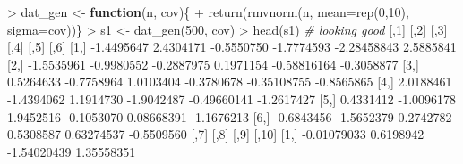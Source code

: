\documentclass[
]{article}
\newenvironment{Shaded}{\begin{snugshade}}{\end{snugshade}}
\newcommand{\AttributeTok}[1]{\textcolor[rgb]{0.77,0.63,0.00}{#1}}
\newcommand{\CommentTok}[1]{\textcolor[rgb]{0.56,0.35,0.01}{\textit{#1}}}
\newcommand{\ControlFlowTok}[1]{\textcolor[rgb]{0.13,0.29,0.53}{\textbf{#1}}}
\newcommand{\DecValTok}[1]{\textcolor[rgb]{0.00,0.00,0.81}{#1}}
\newcommand{\FloatTok}[1]{\textcolor[rgb]{0.00,0.00,0.81}{#1}}
\newcommand{\FunctionTok}[1]{\textcolor[rgb]{0.00,0.00,0.00}{#1}}
\newcommand{\NormalTok}[1]{#1}
\newcommand{\OtherTok}[1]{\textcolor[rgb]{0.56,0.35,0.01}{#1}}
\newcommand{\SpecialCharTok}[1]{\textcolor[rgb]{0.00,0.00,0.00}{#1}}
\begin{document}
\begin{Shaded}
\begin{Highlighting}[]
\SpecialCharTok{\textgreater{}}\NormalTok{ dat\_gen }\OtherTok{\textless{}{-}} \ControlFlowTok{function}\NormalTok{(n, cov)\{}
\SpecialCharTok{+}   \FunctionTok{return}\NormalTok{(}\FunctionTok{rmvnorm}\NormalTok{(n, }\AttributeTok{mean=}\FunctionTok{rep}\NormalTok{(}\DecValTok{0}\NormalTok{,}\DecValTok{10}\NormalTok{), }\AttributeTok{sigma=}\NormalTok{cov))\}}
\SpecialCharTok{\textgreater{}}\NormalTok{ s1 }\OtherTok{\textless{}{-}} \FunctionTok{dat\_gen}\NormalTok{(}\DecValTok{500}\NormalTok{, cov)}
\SpecialCharTok{\textgreater{}} \FunctionTok{head}\NormalTok{(s1) }\CommentTok{\# looking good}
\NormalTok{           [,}\DecValTok{1}\NormalTok{]       [,}\DecValTok{2}\NormalTok{]       [,}\DecValTok{3}\NormalTok{]       [,}\DecValTok{4}\NormalTok{]        [,}\DecValTok{5}\NormalTok{]       [,}\DecValTok{6}\NormalTok{]}
\NormalTok{[}\DecValTok{1}\NormalTok{,] }\SpecialCharTok{{-}}\FloatTok{1.4495647}  \FloatTok{2.4304171} \SpecialCharTok{{-}}\FloatTok{0.5550750} \SpecialCharTok{{-}}\FloatTok{1.7774593} \SpecialCharTok{{-}}\FloatTok{2.28458843}  \FloatTok{2.5885841}
\NormalTok{[}\DecValTok{2}\NormalTok{,] }\SpecialCharTok{{-}}\FloatTok{1.5535961} \SpecialCharTok{{-}}\FloatTok{0.9980552} \SpecialCharTok{{-}}\FloatTok{0.2887975}  \FloatTok{0.1971154} \SpecialCharTok{{-}}\FloatTok{0.58816164} \SpecialCharTok{{-}}\FloatTok{0.3058877}
\NormalTok{[}\DecValTok{3}\NormalTok{,]  }\FloatTok{0.5264633} \SpecialCharTok{{-}}\FloatTok{0.7758964}  \FloatTok{1.0103404} \SpecialCharTok{{-}}\FloatTok{0.3780678} \SpecialCharTok{{-}}\FloatTok{0.35108755} \SpecialCharTok{{-}}\FloatTok{0.8565865}
\NormalTok{[}\DecValTok{4}\NormalTok{,]  }\FloatTok{2.0188461} \SpecialCharTok{{-}}\FloatTok{1.4394062}  \FloatTok{1.1914730} \SpecialCharTok{{-}}\FloatTok{1.9042487} \SpecialCharTok{{-}}\FloatTok{0.49660141} \SpecialCharTok{{-}}\FloatTok{1.2617427}
\NormalTok{[}\DecValTok{5}\NormalTok{,]  }\FloatTok{0.4331412} \SpecialCharTok{{-}}\FloatTok{1.0096178}  \FloatTok{1.9452516} \SpecialCharTok{{-}}\FloatTok{0.1053070}  \FloatTok{0.08668391} \SpecialCharTok{{-}}\FloatTok{1.1676213}
\NormalTok{[}\DecValTok{6}\NormalTok{,] }\SpecialCharTok{{-}}\FloatTok{0.6843456} \SpecialCharTok{{-}}\FloatTok{1.5652379}  \FloatTok{0.2742782}  \FloatTok{0.5308587}  \FloatTok{0.63274537} \SpecialCharTok{{-}}\FloatTok{0.5509560}
\NormalTok{            [,}\DecValTok{7}\NormalTok{]       [,}\DecValTok{8}\NormalTok{]        [,}\DecValTok{9}\NormalTok{]       [,}\DecValTok{10}\NormalTok{]}
\NormalTok{[}\DecValTok{1}\NormalTok{,] }\SpecialCharTok{{-}}\FloatTok{0.01079033}  \FloatTok{0.6198942} \SpecialCharTok{{-}}\FloatTok{1.54020439}  \FloatTok{1.35558351}

\end{Highlighting}
\end{Shaded}
\end{document}
